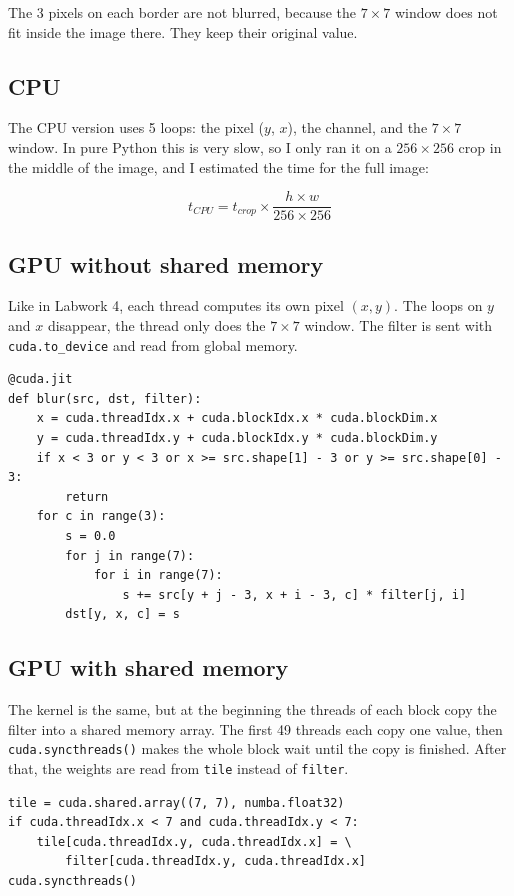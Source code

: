 \documentclass{report}
\begin{document}
The 3 pixels on each border are not blurred, because the $7 \times 7$ window does not fit inside the image there. They keep their original value.

\subsection*{CPU}

The CPU version uses 5 loops: the pixel ($y$, $x$), the channel, and the $7 \times 7$ window. In pure Python this is very slow, so I only ran it on a $256 \times 256$ crop in the middle of the image, and I estimated the time for the full image:

\[
t_{CPU} = t_{crop} \times \frac{h \times w}{256 \times 256}
\]

\subsection*{GPU without shared memory}

Like in Labwork 4, each thread computes its own pixel $(x, y)$. The loops on $y$ and $x$ disappear, the thread only does the $7 \times 7$ window. The filter is sent with \texttt{cuda.to\_device} and read from global memory.

\begin{verbatim}
@cuda.jit
def blur(src, dst, filter):
    x = cuda.threadIdx.x + cuda.blockIdx.x * cuda.blockDim.x
    y = cuda.threadIdx.y + cuda.blockIdx.y * cuda.blockDim.y
    if x < 3 or y < 3 or x >= src.shape[1] - 3 or y >= src.shape[0] - 3:
        return
    for c in range(3):
        s = 0.0
        for j in range(7):
            for i in range(7):
                s += src[y + j - 3, x + i - 3, c] * filter[j, i]
        dst[y, x, c] = s
\end{verbatim}

\subsection*{GPU with shared memory}

The kernel is the same, but at the beginning the threads of each block copy the filter into a shared memory array. The first 49 threads each copy one value, then \texttt{cuda.syncthreads()} makes the whole block wait until the copy is finished. After that, the weights are read from \texttt{tile} instead of \texttt{filter}.

\begin{verbatim}
tile = cuda.shared.array((7, 7), numba.float32)
if cuda.threadIdx.x < 7 and cuda.threadIdx.y < 7:
    tile[cuda.threadIdx.y, cuda.threadIdx.x] = \
        filter[cuda.threadIdx.y, cuda.threadIdx.x]
cuda.syncthreads()
\end{verbatim}
\end{document}
